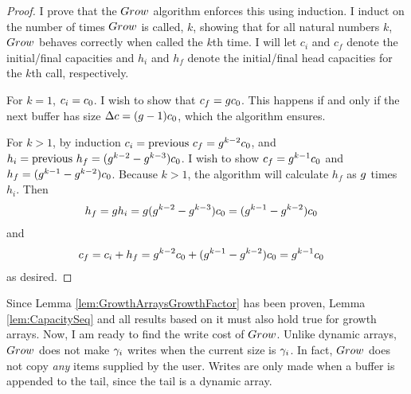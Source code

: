 \begin{proof}
	I prove that the $Grow$ algorithm enforces this using induction. I induct on the number of times $Grow$ is called, $k$, showing that for all natural numbers $k$, $Grow$ behaves correctly when called the $k$th time. I will let $c_i$ and $c_f$ denote the initial/final capacities and $h_i$ and $h_f$ denote the initial/final head capacities for the $k$th call, respectively.

	For $k = 1$, $c_i = c_0$. I wish to show that $c_f = gc_0$. This happens if and only if the next buffer has size $\Delta c = (g - 1)c_0$, which the algorithm ensures.
	
	For $k > 1$, by induction $c_i = \text{previous }c_f = g^{k - 2}c_0$, and $h_i = \text{previous }h_f = (g^{k - 2} - g^{k - 3})c_0$. I wish to show $c_f = g^{k - 1}c_0$ and $h_f = (g^{k - 1} - g^{k - 2})c_0$. Because $k > 1$, the algorithm will calculate $h_f$ as $g$ times $h_i$. Then
	\begin{align*}
	h_f &= g h_i = g (g^{k - 2} - g^{k - 3})c_0 = (g^{k - 1} - g^{k - 2})c_0
	\end{align*}
	and
	\begin{align*}
	c_f &= c_i + h_f = g^{k - 2}c_0 + (g^{k - 1} - g^{k - 2})c_0 = g^{k - 1}c_0
	\end{align*}
	as desired.
\end{proof}

Since Lemma \ref{lem:GrowthArraysGrowthFactor} has been proven, Lemma \ref{lem:CapacitySeq} and all results based on it must also hold true for growth arrays. Now, I am ready to find the write cost of $Grow$. Unlike dynamic arrays, $Grow$ does not make $\gamma_i$ writes when the current size is $\gamma_i$. In fact, $Grow$ does not copy \textit{any} items supplied by the user. Writes are only made when a buffer is appended to the tail, since the tail is a dynamic array.


